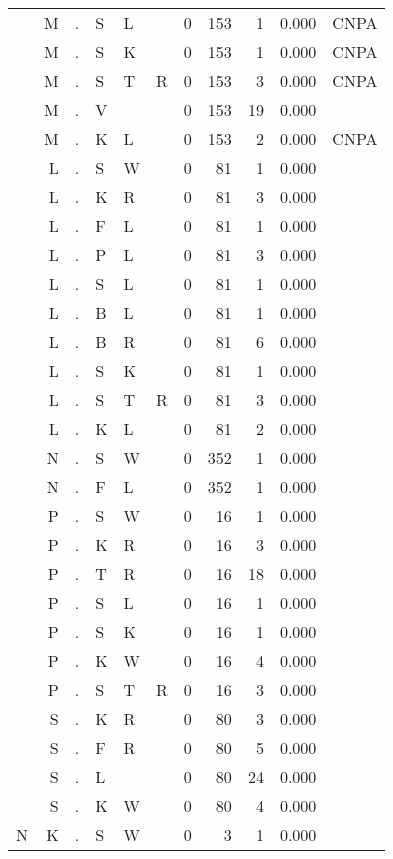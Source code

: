 \begin{longtable}{r@{ } r@{ } c@{ } l@{ } l@{ } l@{ } r r r r l }
  & M & . & S & L &   & 0 & 153 & 1 & 0.000 & \textsc{CNPA} \\
  & M & . & S & K &   & 0 & 153 & 1 & 0.000 & \textsc{CNPA} \\
  & M & . & S & T & R & 0 & 153 & 3 & 0.000 & \textsc{CNPA} \\
  & M & . & V &   &   & 0 & 153 & 19 & 0.000 &  \\
  & M & . & K & L &   & 0 & 153 & 2 & 0.000 & \textsc{CNPA} \\
  & L & . & S & W &   & 0 & 81 & 1 & 0.000 &  \\
  & L & . & K & R &   & 0 & 81 & 3 & 0.000 &  \\
  & L & . & F & L &   & 0 & 81 & 1 & 0.000 &  \\
  & L & . & P & L &   & 0 & 81 & 3 & 0.000 &  \\
  & L & . & S & L &   & 0 & 81 & 1 & 0.000 &  \\
  & L & . & B & L &   & 0 & 81 & 1 & 0.000 &  \\
  & L & . & B & R &   & 0 & 81 & 6 & 0.000 &  \\
  & L & . & S & K &   & 0 & 81 & 1 & 0.000 &  \\
  & L & . & S & T & R & 0 & 81 & 3 & 0.000 &  \\
  & L & . & K & L &   & 0 & 81 & 2 & 0.000 &  \\
  & N & . & S & W &   & 0 & 352 & 1 & 0.000 &  \\
  & N & . & F & L &   & 0 & 352 & 1 & 0.000 &  \\
  & P & . & S & W &   & 0 & 16 & 1 & 0.000 &  \\
  & P & . & K & R &   & 0 & 16 & 3 & 0.000 &  \\
  & P & . & T & R &   & 0 & 16 & 18 & 0.000 &  \\
  & P & . & S & L &   & 0 & 16 & 1 & 0.000 &  \\
  & P & . & S & K &   & 0 & 16 & 1 & 0.000 &  \\
  & P & . & K & W &   & 0 & 16 & 4 & 0.000 &  \\
  & P & . & S & T & R & 0 & 16 & 3 & 0.000 &  \\
  & S & . & K & R &   & 0 & 80 & 3 & 0.000 &  \\
  & S & . & F & R &   & 0 & 80 & 5 & 0.000 &  \\
  & S & . & L &   &   & 0 & 80 & 24 & 0.000 &  \\
  & S & . & K & W &   & 0 & 80 & 4 & 0.000 &  \\
N & K & . & S & W &   & 0 & 3 & 1 & 0.000 &  \\

\end{longtable}
